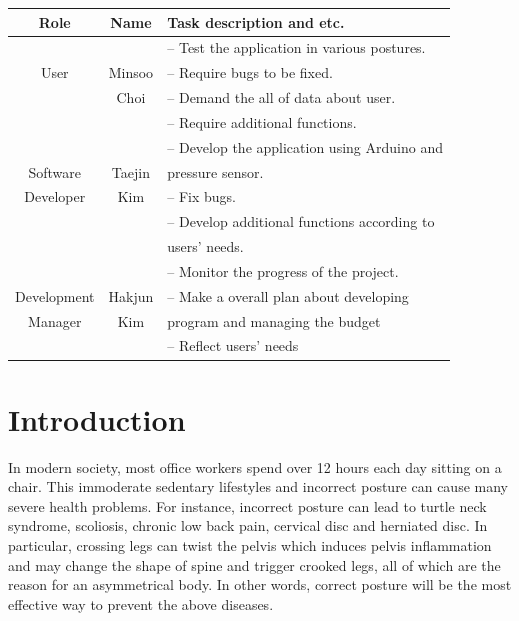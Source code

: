 \documentclass[conference]{IEEEtran}
\begin{document}
\begin{table}

\begin{tabular}{|c|c|l|}\hline

Role & Name & Task description and etc. \\ \hline \hline

&  &  -- Test the application in various postures. \\ 

User & Minsoo & -- Require bugs to be fixed.  \\ 

& Choi & -- Demand the all of data about user. \\ 

&  & -- Require additional functions. \\ \hline

&  &  -- Develop the application using Arduino and\\ 

Software & Taejin & pressure sensor. \\ 

Developer & Kim & -- Fix bugs. \\ 

&  & -- Develop additional functions according to\\ 

&  & users' needs. \\ \hline

&  &  -- Monitor the progress of the project. \\ 

Development & Hakjun & -- Make a overall plan about developing \\ 

Manager& Kim & program and managing the budget \\ 

&  & -- Reflect users' needs \\ \hline

\end{tabular}

\end{table}


\IEEEpeerreviewmaketitle
\large



\section{Introduction}

In modern society, most office workers spend over 12 hours each day sitting on a chair. This immoderate sedentary lifestyles and incorrect posture can cause many severe health problems. For instance, incorrect posture can lead to turtle neck syndrome, scoliosis, chronic low back pain, cervical disc and herniated disc. In particular, crossing legs can twist the pelvis which induces pelvis inflammation and may change the shape of spine and trigger crooked legs, all of which are the reason for an asymmetrical body. In other words, correct posture will be the most effective way to prevent the above diseases.
\end{document}
